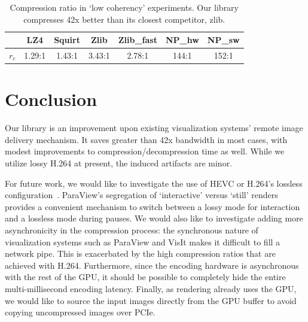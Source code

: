 \documentclass[review]{vgtc}                 %
\begin{document}
\begin{table}[htb]
  \caption{Compression ratio in `low coherency' experiments. Our library
	compresses 42x better than its closest competitor, zlib.}
  \label{tab:latency}
  \scriptsize
  \begin{center}
    \begin{tabular}{ccccccc}
      & LZ4 & Squirt & Zlib & Zlib\_fast & NP\_hw & NP\_sw \\
    \hline
      \(r_c\) & 1.29:1 & 1.43:1 & 3.43:1 & 2.78:1 & 144:1 & 152:1 \\
    \end{tabular}
  \end{center}
\end{table}


\section{Conclusion}


Our library is an improvement upon existing visualization systems'
remote image delivery mechanism.  It saves greater than 42x bandwidth
in most cases, with modest improvements to compression/decompression
time as well.  While we utilize lossy H.264 at present, the induced
artifacts are minor.


For future work, we would like to investigate the use of HEVC or
H.264's
lossless configuration~\cite{sullivan2012overview}.  ParaView's
segregation of `interactive' versus `still' renders provides a
convenient mechanism to switch between a lossy mode for interaction
and a lossless mode during pauses.  We would also like to investigate
adding more asynchronicity in the compression process: the synchronous
nature of visualization systems such as ParaView and VisIt makes it
difficult to fill a network pipe.  This is exacerbated by the high
compression ratios that are achieved with H.264.  Furthermore, since
the encoding hardware is asynchronous with the rest of the GPU, it
should be possible to completely hide the entire multi-millisecond
encoding latency.  Finally, as rendering already uses the GPU, we would
like to source the input images directly from the GPU buffer to avoid
copying uncompressed images over PCIe.
\end{document}
